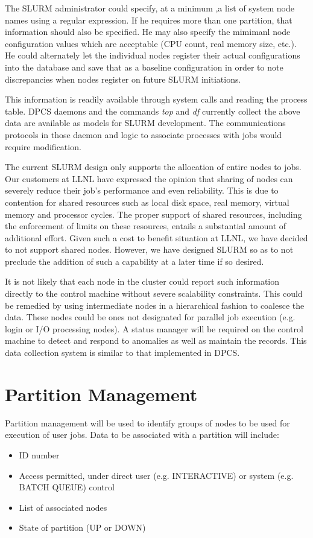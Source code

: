 The SLURM administrator could specify, at a minimum ,a list of system node 
names using a regular expression. 
If he requires more than one partition, that information should also be specified. 
He may also specify the mimimanl node configuration values which are acceptable 
(CPU count, real memory size, etc.). He could alternately let the individual 
nodes register their actual configurations into the database and save that 
as a baseline configuration in order to note discrepancies when nodes register 
on future SLURM initiations.

This information is readily available through system calls and reading the
process table. DPCS daemons and the commands \textit{top} and \textit{df} 
currently collect the above data are available as models for SLURM development. 
The communications protocols in those daemon and logic to associate processes 
with jobs would require modification.

The current SLURM design only supports the allocation of entire nodes to 
jobs. Our customers at LLNL have expressed the opinion that sharing of 
nodes can severely reduce their job's performance and even reliability. 
This is due to contention for shared resources such as local disk space, 
real memory, virtual memory and processor cycles. The proper support of 
shared resources, including the enforcement of limits on these resources, 
entails a substantial amount of additional effort. Given such a cost to 
benefit situation at LLNL, we have decided to not support shared nodes. 
However, we have designed SLURM so as to not preclude the addition of 
such a capability at a later time if so desired.

It is not likely that each node in the cluster could report such information
directly to the control machine without severe scalability constraints. This
could be remedied by using intermediate nodes in a hierarchical fashion to
coalesce the data. These nodes could be ones not designated for parallel job
execution (e.g. login or I/O processing nodes). A status manager will be
required on the control machine to detect and respond to anomalies as well as
maintain the records. This data collection system is similar to that
implemented in DPCS. 

\section{Partition Management}

Partition management will be used to identify groups of nodes to be used for
execution of user jobs. Data to be associated with a partition will include:
\begin{itemize}
\item ID number
\item Access permitted, under direct user (e.g. INTERACTIVE) or system (e.g. BATCH QUEUE) control
\item List of associated nodes
\item State of partition (UP or DOWN)
\end{itemize}

